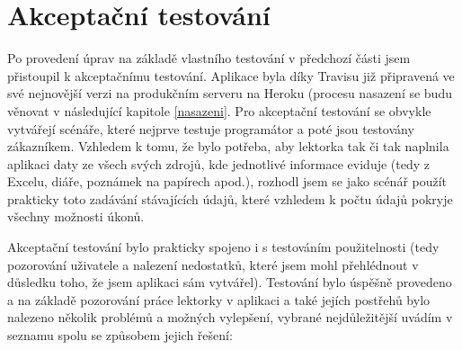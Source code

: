     \section{Akceptační testování}
    Po provedení úprav na základě vlastního testování v předchozí části jsem přistoupil k akceptačnímu testování. Aplikace byla díky Travisu již připravená ve své nejnovější verzi na produkčním serveru na Heroku (procesu nasazení se budu věnovat v následující kapitole \ref{nasazeni}. Pro akceptační testování se obvykle vytvářejí scénáře, které nejprve testuje programátor a poté jsou testovány zákazníkem. Vzhledem k tomu, že bylo potřeba, aby lektorka tak či tak naplnila aplikaci daty ze všech svých zdrojů, kde jednotlivé informace eviduje (tedy z Excelu, diáře, poznámek na papírech apod.), rozhodl jsem se jako scénář použít prakticky toto zadávání stávajících údajů, které vzhledem k počtu údajů pokryje všechny možnosti úkonů.
    
    Akceptační testování bylo prakticky spojeno i s testováním použitelnosti (tedy pozorování uživatele a nalezení nedostatků, které jsem mohl přehlédnout v důsledku toho, že jsem aplikaci sám vytvářel). Testování bylo úspěšně provedeno a na základě pozorování práce lektorky v aplikaci a také jejích postřehů bylo nalezeno několik problémů a možných vylepšení, vybrané nejdůležitější uvádím v seznamu spolu se způsobem jejich řešení:
    
